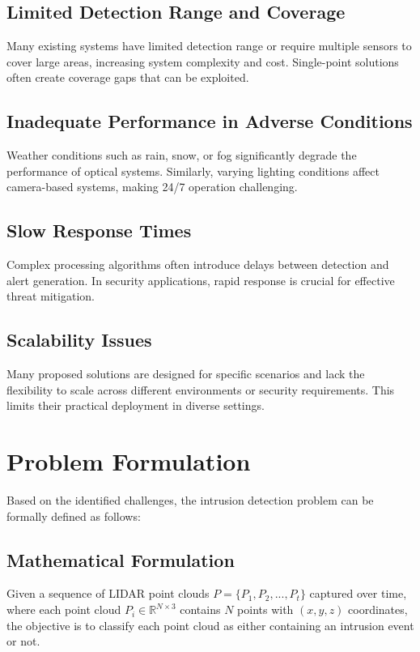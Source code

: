 \documentclass[conference]{IEEEtran}
\begin{document}
\subsection{Limited Detection Range and Coverage}
Many existing systems have limited detection range or require multiple sensors to cover large areas, increasing system complexity and cost. Single-point solutions often create coverage gaps that can be exploited.

\subsection{Inadequate Performance in Adverse Conditions}
Weather conditions such as rain, snow, or fog significantly degrade the performance of optical systems. Similarly, varying lighting conditions affect camera-based systems, making 24/7 operation challenging.

\subsection{Slow Response Times}
Complex processing algorithms often introduce delays between detection and alert generation. In security applications, rapid response is crucial for effective threat mitigation.

\subsection{Scalability Issues}
Many proposed solutions are designed for specific scenarios and lack the flexibility to scale across different environments or security requirements. This limits their practical deployment in diverse settings.

\section{Problem Formulation}
Based on the identified challenges, the intrusion detection problem can be formally defined as follows:

\subsection{Mathematical Formulation}
Given a sequence of LIDAR point clouds $P = \{P_1, P_2, ..., P_t\}$ captured over time, where each point cloud $P_i \in \mathbb{R}^{N \times 3}$ contains $N$ points with $(x, y, z)$ coordinates, the objective is to classify each point cloud as either containing an intrusion event or not.
\end{document}
